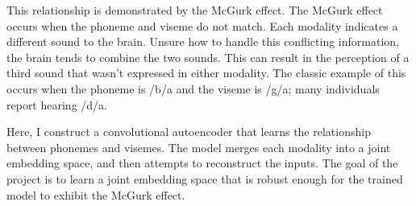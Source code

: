 \documentclass[conference]{IEEEtran}
\begin{document}
This relationship is demonstrated by the McGurk effect.\cite{McGurk1976} The McGurk effect occurs when the phoneme and viseme do not match. Each modality indicates a different sound to the brain. Unsure how to handle this conflicting information, the brain tends to combine the two sounds. This can result in the perception of a third sound that wasn't expressed in either modality. The classic example of this occurs when the phoneme is /b/a and the viseme is /g/a; many individuals report hearing /d/a.

Here, I construct a convolutional autoencoder that learns the relationship between phonemes and visemes. The model merges each modality into a joint embedding space, and then attempts to reconstruct the inputs. The goal of the project is to learn a joint embedding space that is robust enough for the trained model to exhibit the McGurk effect.
%
%

\end{document}
